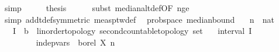 \begin{isabellebody}
\ simp\isanewline
\ \ \isamarkupfalse%
\ \isamarkupfalse%
\ {\isacharquery}{\kern0pt}thesis\isanewline
\ \ \ \ \isamarkupfalse%
\ {\isacharparenleft}{\kern0pt}subst\ median{\isacharunderscore}{\kern0pt}alt{\isacharunderscore}{\kern0pt}def{\isacharbrackleft}{\kern0pt}OF\ n{\isacharunderscore}{\kern0pt}ge{\isacharunderscore}{\kern0pt}{}{\isacharbrackright}{\kern0pt}{\isacharparenright}{\kern0pt}\isanewline
\ \ \ \ \isamarkupfalse%
\ {\isacharparenleft}{\kern0pt}simp\ add{\isacharcolon}{\kern0pt}t{\isacharunderscore}{\kern0pt}def{\isacharbrackleft}{\kern0pt}symmetric{\isacharbrackright}{\kern0pt}\ meas{\isacharunderscore}{\kern0pt}ptw{\isacharunderscore}{\kern0pt}def{\isacharparenright}{\kern0pt}\isanewline
{}\isamarkupfalse%
%
\endisatagproof
{\isafoldproof}%
%
\isadelimproof
\isanewline
%
\endisadelimproof
\isanewline
{}\isamarkupfalse%
\ {\isacharparenleft}{\kern0pt}\ prob{\isacharunderscore}{\kern0pt}space{\isacharparenright}{\kern0pt}\ median{\isacharunderscore}{\kern0pt}bound{\isacharcolon}{\kern0pt}\isanewline
\ \ \ n\ {\isacharcolon}{\kern0pt}{\isacharcolon}{\kern0pt}\ nat\isanewline
\ \ \ I\ {\isacharcolon}{\kern0pt}{\isacharcolon}{\kern0pt}\ {\isachardoublequoteopen}{\isacharparenleft}{\kern0pt}{\isacharprime}{\kern0pt}b\ {\isacharcolon}{\kern0pt}{\isacharcolon}{\kern0pt}\ {\isacharbraceleft}{\kern0pt}linorder{\isacharunderscore}{\kern0pt}topology{\isacharcomma}{\kern0pt}\ second{\isacharunderscore}{\kern0pt}countable{\isacharunderscore}{\kern0pt}topology{\isacharbraceright}{\kern0pt}{\isacharparenright}{\kern0pt}\ set{\isachardoublequoteclose}\isanewline
\ \ \ {\isachardoublequoteopen}interval\ I{\isachardoublequoteclose}\isanewline
\ \ \ {\isachardoublequoteopen}{\isasymalpha}\ {\isachargreater}{\kern0pt}\ {}{\isachardoublequoteclose}\isanewline
\ \ \ {\isachardoublequoteopen}{\isasymepsilon}\ {\isasymin}\ {\isacharbraceleft}{\kern0pt}{}{\isacharless}{\kern0pt}{\isachardot}{\kern0pt}{\isachardot}{\kern0pt}{\isacharless}{\kern0pt}{}{\isacharbraceright}{\kern0pt}{\isachardoublequoteclose}\isanewline
\ \ \ {\isachardoublequoteopen}indep{\isacharunderscore}{\kern0pt}vars\ {\isacharparenleft}{\kern0pt}{\isasymlambda}{\isacharunderscore}{\kern0pt}{\isachardot}{\kern0pt}\ borel{\isacharparenright}{\kern0pt}\ X\ {\isacharbraceleft}{\kern0pt}{}{\isachardot}{\kern0pt}{\isachardot}{\kern0pt}{\isacharless}{\kern0pt}n{\isacharbraceright}{\kern0pt}{\isachardoublequoteclose}\isanewline

\end{isabellebody}
